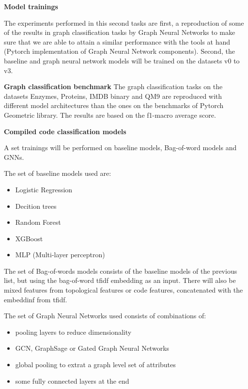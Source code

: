 \textbf{Model trainings}

The experiments performed in this second tasks are first, a reproduction of some of the results in graph classification tasks by Graph Neural Networks to make sure that we are able to attain a similar performance with the tools at hand (Pytorch implementation of Graph Neural Network components). Second, the baseline and graph neural network models will be trained on the datasets v0 to v3. 

\textbf{Graph classification benchmark}
The graph classification tasks on the datasets Enzymes, Proteins, IMDB binary and QM9 are reproduced with different model architectures than the ones on the benchmarks of Pytorch Geometric library. The results are based on the f1-macro average score.




\textbf{Compiled code classification models}


A set trainings will be performed on baseline models, Bag-of-word models and GNNs.

The set of baseline models used are:
\begin{itemize}
	\item Logistic Regression
	\item Decition trees
	\item Random Forest
	\item XGBoost
	\item MLP (Multi-layer perceptron)
\end{itemize}

The set of Bag-of-words models consists of the baseline models of the previous list, but using the bag-of-word tfidf embedding as an input. There will also be mixed features from topological features or code features, concatenated with the embeddinf from tfidf.

The set of Graph Neural Networks used consists of combinations of:
\begin{itemize}
	\item pooling layers to reduce dimensionality
	\item GCN, GraphSage or Gated Graph Neural Networks
	\item global pooling to extrat a graph level set of attributes
	\item some fully connected layers at the end
\end{itemize}

